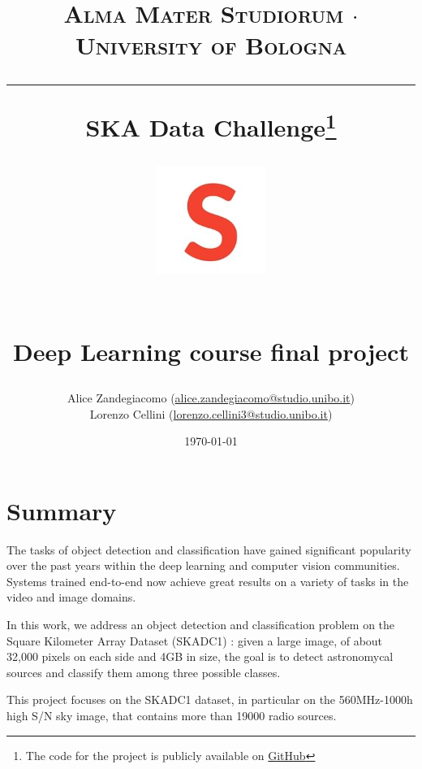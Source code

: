 \documentclass[a4paper,10pt]{report}
\begin{document}
\frenchspacing

\title{
  {{\large{\textsc{Alma Mater Studiorum $\cdot$ University of Bologna}}}}
  \rule{\textwidth}{0.4pt}\vspace{3mm}
  \textbf{SKA Data Challenge\footnote{The code for the project is publicly available on \href{https://github.com/Lorenz92/SKADC1}{GitHub}}}
  \begin{figure}[!htb]
    \centering
    \includegraphics[width = 100pt]{squad-logo}
  \end{figure} \\
  Deep Learning course final project
}

\author{Alice Zandegiacomo (\href{mailto:alice.zandegiacomo@studio.unibo.it}{alice.zandegiacomo@studio.unibo.it}) \\ Lorenzo Cellini (\href{mailto:lorenzo.cellini3@studio.unibo.it}{lorenzo.cellini3@studio.unibo.it})}
\date{\today}
\maketitle
\newpage
\tableofcontents
\setcounter{tocdepth}{1}
\newpage


\chapter{Summary}\label{chap:introduction}

The tasks of object detection and classification have gained significant popularity over the past years within the deep learning and computer vision communities. Systems trained end-to-end now achieve great results on a variety of tasks in the video and image domains.

In this work, we address an object detection and classification problem on the Square Kilometer Array Dataset (SKADC1) \cite{ska-site}: given a large image, of about 32,000 pixels on each side and 4GB in size, the goal is to detect astronomycal sources and classify them among three possible classes.

This project focuses on the SKADC1 dataset, in particular on the 560MHz-1000h high S/N sky image, that contains more than \num{19000} radio sources.
\end{document}
